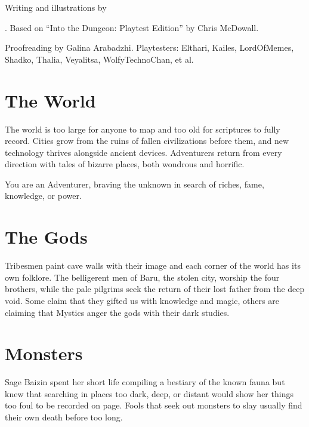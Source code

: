 \documentclass[itdr]{subfiles}
\begin{document}
\begin{minipage}{\textwidth}
\toc[2] %
\end{minipage}

\vfill

\begin{minipage}{\textwidth}
\begin{center}\footnotesize
	Writing and illustrations by \author{}. Based on ``Into the Dungeon: Playtest Edition'' by Chris McDowall.
	
	Proofreading by Galina Arabadzhi. Playtesters: Elthari, Kailes, LordOfMemes, Shadko, Thalia, Veyalitsa, WolfyTechnoChan, et al.
\end{center}
\end{minipage}

\clearpage

\label{ch:introduction}

\section*{The World}

The world is too large for anyone to map and too old for scriptures to fully record. Cities grow from the ruins of fallen civilizations before them, and new technology thrives alongside ancient devices. \mbox{Adventurers} return from every direction with tales of bizarre places, both wondrous and horrific.

You are an Adventurer, braving the unknown in search of riches, fame, knowledge, or power.

\section*{The Gods}

Tribesmen paint cave walls with their image and each corner of the world has its own folklore. The belligerent men of Baru, the stolen city, worship the four brothers, while the pale pilgrims seek the return of their lost father from the deep void. Some claim that they gifted us with knowledge and magic, others are claiming that Mystics anger the gods with their dark studies.

\section*{Monsters}

Sage Baizin spent her short life compiling a bestiary of the known fauna but knew that searching in places too dark, deep, or distant would show her things too foul to be recorded on page. Fools that seek out monsters to slay usually find their own death before too long.
\end{document}
